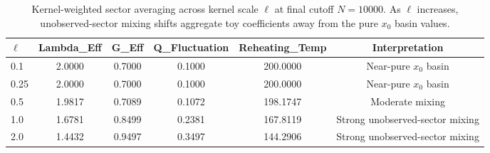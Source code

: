 \begin{table}[t]
  \centering
  \caption{Kernel-weighted sector averaging across kernel scale $\ell$ at final cutoff $N=10000$. As $\ell$ increases, unobserved-sector mixing shifts aggregate toy coefficients away from the pure $x_0$ basin values.}
  \label{tab:effective_coefficients}
  \begin{tabular}{lccccc}
    \toprule
    $\ell$ & Lambda\_Eff & G\_Eff & Q\_Fluctuation & Reheating\_Temp & Interpretation \\
    \midrule
    0.1 & 2.0000 & 0.7000 & 0.1000 & 200.0000 & Near-pure $x_0$ basin \\
    0.25 & 2.0000 & 0.7000 & 0.1000 & 200.0000 & Near-pure $x_0$ basin \\
    0.5 & 1.9817 & 0.7089 & 0.1072 & 198.1747 & Moderate mixing \\
    1.0 & 1.6781 & 0.8499 & 0.2381 & 167.8119 & Strong unobserved-sector mixing \\
    2.0 & 1.4432 & 0.9497 & 0.3497 & 144.2906 & Strong unobserved-sector mixing \\
    \bottomrule
  \end{tabular}
\end{table}
